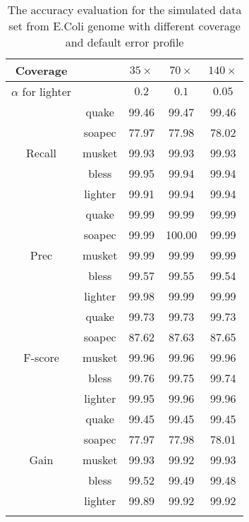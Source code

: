 \documentclass[10pt]{article}
\begin{document}
\begin{table}[h!]
\caption{The accuracy evaluation for the simulated data set from E.Coli genome with different coverage and default error profile}
\begin{tabular}{|c|c|c|c|c|} \hline
Coverage &	&$35\times$  & $70\times$ & $140\times$ \\ \hline
$\alpha$ for lighter & & $0.2$ & $0.1$ & $0.05$ \\ \hhline{|=|=|=|=|=|}
		&quake	&99.46	&99.47	&99.46 \\ \hline
		&soapec	&77.97	&77.98	&78.02  \\ \hline 
Recall	&musket	&99.93	&99.93	&99.93  \\ \hline
		&bless	&99.95	&99.94	&99.94  \\ \hline
		&lighter&99.91	&99.94	&99.94  \\ \hhline{|=|=|=|=|=|}
		
		&quake	&99.99	&99.99	&99.99  \\ \hline
		&soapec	&99.99	&100.00	&99.99   \\ \hline
Prec	&musket	&99.99	&99.99	&99.99   \\ \hline
		&bless	&99.57	&99.55	&99.54	 \\ \hline
		&lighter	&99.98	&99.99	&99.99 \\ \hhline{|=|=|=|=|=|}
		
		&quake	&99.73	&99.73	&99.73	 \\ \hline
		&soapec	&87.62	&87.63	&87.65	 \\ \hline
F-score	&musket	&99.96	&99.96	&99.96	 \\ \hline
		&bless	&99.76	&99.75	&99.74	 \\ \hline
		&lighter	&99.95	&99.96	&99.96	\\ \hhline{|=|=|=|=|=|}
		
		&quake	&99.45	&99.45	&99.45	 \\ \hline
		&soapec	&77.97	&77.98	&78.01	 \\ \hline
Gain	&musket	&99.93	&99.92	&99.93	 \\ \hline
		&bless	&99.52	&99.49	&99.48	 \\ \hline
		&lighter	&99.89	&99.92	&99.92 \\ \hhline{|=|=|=|=|=|}
	
\end{tabular}
\end{table}
\end{document}
